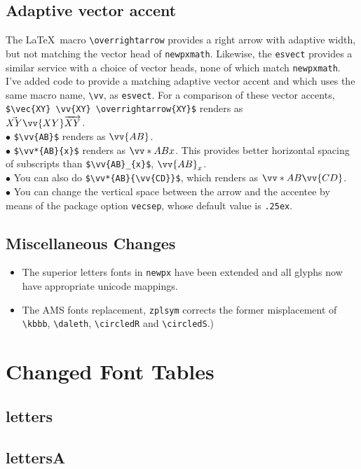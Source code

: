 \documentclass[11pt]{article}
\theoremstyle{oldplain}
\theoremstyle{plain}
\begin{document}
\subsection{Adaptive vector accent} The \LaTeX\ macro \verb|\overrightarrow| provides a right arrow with adaptive width, but not matching the vector head of {\tt newpxmath}. Likewise, the {\tt esvect} provides a similar service with a choice of vector heads, none of which match {\tt newpxmath}. I've added code to provide a matching adaptive vector accent and which uses the same macro name, \verb|\vv|, as {\tt esvect}.
For a comparison of these vector accents, \verb|$\vec{XY} \vv{XY} \overrightarrow{XY}$| renders as\\ 
$\vec{XY} \vv{XY} \overrightarrow{XY}$.\\ 
$\bullet$ \verb|$\vv{AB}$|  renders as $\vv{AB}$.\\ 
$\bullet$ \verb|$\vv*{AB}{x}$| renders as $\vv*{AB}{x}$. This provides better horizontal spacing of subscripts than \verb|$\vv{AB}_{x}$|, $\vv{AB}_{x}$.\\
$\bullet$  You can also do \verb|$\vv*{AB}{\vv{CD}}$|, which  renders as $\vv*{AB}{\vv{CD}}$.\\
$\bullet$ You can change the vertical space between the arrow and the accentee by means of the package option {\tt vecsep}, whose default value is {\tt .25ex}.

\subsection{Miscellaneous Changes}
\begin{itemize}
\item
The superior letters fonts in {\tt newpx} 
have been extended and all glyphs now have appropriate unicode mappings.
\item
The AMS fonts replacement, {\tt zplsym} corrects the former misplacement of \verb|\kbbb|, \verb|\daleth|, \verb|\circledR| and \verb|\circledS|.)
\end{itemize}
\newpage
\section{Changed Font Tables}
\subsection{letters}
\newpage  
\subsection{lettersA}
\newpage  
\end{document}
